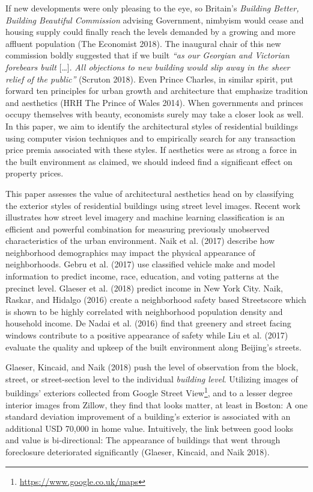 \documentclass[]{article}
\let\rmarkdownfootnote\footnote%
\def\footnote{\protect\rmarkdownfootnote}
\begin{document}
If new developments were only pleasing to the eye, so Britain's
\emph{Building Better, Building Beautiful Commission} advising
Government, nimbyism would cease and housing supply could finally reach
the levels demanded by a growing and more affluent population (The
Economist 2018). The inaugural chair of this new commission boldly
suggested that if we built \emph{``as our Georgian and Victorian
forebears built} {[}\ldots{}{]}. \emph{All objections to new building
would slip away in the sheer relief of the public''} (Scruton 2018).
Even Prince Charles, in similar spirit, put forward ten principles for
urban growth and architecture that emphasize tradition and aesthetics
(HRH The Prince of Wales 2014). When governments and princes occupy
themselves with beauty, economists surely may take a closer look as
well. In this paper, we aim to identify the architectural styles of
residential buildings using computer vision techniques and to
empirically search for any transaction price premia associated with
these styles. If aesthetics were as strong a force in the built
environment as claimed, we should indeed find a significant effect on
property prices.

This paper assesses the value of architectural aesthetics head on by
classifying the exterior styles of residential buildings using street
level images. Recent work illustrates how street level imagery and
machine learning classification is an efficient and powerful combination
for measuring previously unobserved characteristics of the urban
environment. Naik et al. (2017) describe how neighborhood demographics
may impact the physical appearance of neighborhoods. Gebru et al. (2017)
use classified vehicle make and model information to predict income,
race, education, and voting patterns at the precinct level. Glaeser et
al. (2018) predict income in New York City. Naik, Raskar, and Hidalgo
(2016) create a neighborhood safety based Streetscore which is shown to
be highly correlated with neighborhood population density and household
income. De Nadai et al. (2016) find that greenery and street facing
windows contribute to a positive appearance of safety while Liu et al.
(2017) evaluate the quality and upkeep of the built environment along
Beijing's streets.

Glaeser, Kincaid, and Naik (2018) push the level of observation from the
block, street, or street-section level to the individual
\emph{building level}. Utilizing images of buildings' exteriors
collected from Google Street
View\footnote{\href{https://www.google.co.uk/maps}{https://www.google.co.uk/maps}},
and to a lesser degree interior images from Zillow, they find that looks
matter, at least in Boston: A one standard deviation improvement of a
building's exterior is associated with an additional USD 70,000 in home
value. Intuitively, the link between good looks and value is
bi-directional: The appearance of buildings that went through
foreclosure deteriorated significantly (Glaeser, Kincaid, and Naik
2018).
\end{document}

